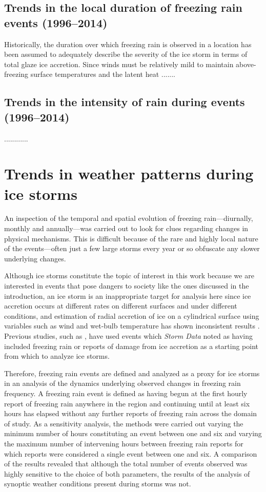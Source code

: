 \documentclass[twocol]{ametsoc}
\begin{document}
\subsection{Trends in the local duration of freezing rain events (1996--2014)}
Historically, the duration over which freezing rain is observed in a location has been assumed to adequately describe the severity of the ice storm in terms of total glaze ice accretion. Since winds must be relatively mild to maintain above-freezing surface temperatures and the latent heat .......

\subsection{Trends in the intensity of rain during events (1996--2014)}
............

\section{Trends in weather patterns during ice storms}
An inspection of the temporal and spatial evolution of freezing rain---diurnally, monthly and annually---was carried out to look for clues regarding changes in physical mechanisms. This is difficult because of the rare and highly local nature of the events---often just a few large storms every year or so obfuscate any slower underlying changes.

Although ice storms constitute the topic of interest in this work because we are interested in events that pose dangers to society like the ones discussed in the introduction, an ice storm is an inappropriate target for analysis here since ice accretion occurs at different rates on different surfaces and under different conditions, and estimation of radial accretion of ice on a cylindrical surface using variables such as wind and wet-bulb temperature has shown inconsistent results \citep{add a citation for this}. Previous studies, such as \citet{swaminathan2015modeling}, have used events which \textit{Storm Data} noted as having included freezing rain or reports of damage from ice accretion as a starting point from which to analyze ice storms. 

Therefore, freezing rain events are defined and analyzed as a proxy for ice storms in an analysis of the dynamics underlying observed changes in freezing rain frequency. A freezing rain event is defined as having begun at the first hourly report of freezing rain anywhere in the region and continuing until at least six hours has elapsed without any further reports of freezing rain across the domain of study. As a sensitivity analysis, the methods were carried out varying the minimum number of hours constituting an event between one and six and varying the maximum number of intervening hours between freezing rain reports for which reports were considered a single event between one and six. A comparison of the results revealed that although the total number of events observed was highly sensitive to the choice of both parameters, the results of the analysis of synoptic weather conditions present during storms was not.
\end{document}
